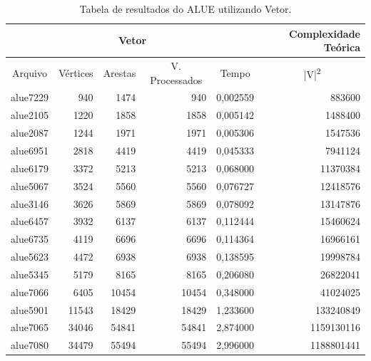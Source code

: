 \documentclass[
	12pt,				%
	oneside,			%
	a4paper,			%
	english,			%
	french,				%
	spanish,			%
	brazil,				%
	]{abntex2}
\begin{document}
\begin{table}[H]
  \centering    
  \begin{tabular}{|c|r|r|r|r|r|}
    \toprule
    \multicolumn{5}{|c|}{\cellcolor{gray!25}\textbf{Vetor}} & \cellcolor{gray!25}\textbf{Complexidade Teórica}\\
    \midrule
    \multicolumn{1}{|c|}{\cellcolor{gray!10}Arquivo} & \multicolumn{1}{|c|}{\cellcolor{gray!10}Vértices} & \multicolumn{1}{|c|}{\cellcolor{gray!10}Arestas} & \multicolumn{1}{|c|}{\cellcolor{gray!10}V. Processados} & \multicolumn{1}{|c|}{\cellcolor{gray!10}Tempo} & \multicolumn{1}{|c|}{\cellcolor{gray!10}|V|\textsuperscript{2}}\\
    \hline
    alue7229 & 940 & 1474 & 940 & 0,002559 & 883600\\
    \hline
    alue2105 & 1220 & 1858 & 1858 & 0,005142 & 1488400\\
    \hline
    alue2087 & 1244 & 1971 & 1971 & 0,005306 & 1547536\\
    \hline
    alue6951 & 2818 & 4419 & 4419 & 0,045333 & 7941124\\
    \hline
    alue6179 & 3372 & 5213 & 5213 & 0,068000 & 11370384\\
    \hline
    alue5067 & 3524 & 5560 & 5560 & 0,076727 & 12418576\\
    \hline
    alue3146 & 3626 & 5869 & 5869 & 0,078092 & 13147876\\
    \hline
    alue6457 & 3932 & 6137 & 6137 & 0,112444 & 15460624\\
    \hline
    alue6735 & 4119 & 6696 & 6696 & 0,114364 & 16966161\\
    \hline
    alue5623 & 4472 & 6938 & 6938 & 0,138595 & 19998784\\
    \hline
    alue5345 & 5179 & 8165 & 8165 & 0,206080 & 26822041\\
    \hline
    alue7066 & 6405 & 10454 & 10454 & 0,348000 & 41024025\\
    \hline
    alue5901 & 11543 & 18429 & 18429 & 1,233600 & 133240849\\
    \hline
    alue7065 & 34046 & 54841 & 54841 & 2,874000 & 1159130116\\
    \hline
    alue7080 & 34479 & 55494 & 55494 & 2,996000 & 1188801441\\
    \hline
  \end{tabular}
  \caption{Tabela de resultados do ALUE utilizando Vetor.}  
  \label{tab:AlueVetor}
\end{table}
\end{document}
